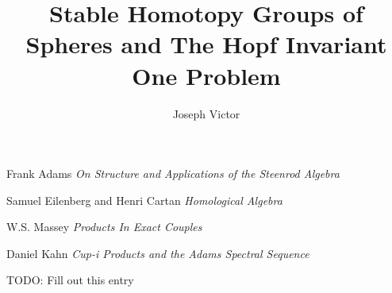 \documentclass[a4paper,12pt]{article}
\begin{document}
\newcommand{\A}[0]{\mathcal{A}}
\newcommand{\Z}[0]{\mathbb{Z}}

\newtheorem{mydef}{Definition}
\newtheorem{Theorem}{Theorem}
\newtheorem{Lemma}{Lemma}



\title{Stable Homotopy Groups of Spheres and The Hopf Invariant One Problem}
\author{Joseph Victor}
\maketitle







\begin{thebibliography}{99}

  Frank Adams
  \emph{On Structure and Applications of the Steenrod Algebra}
  
  Samuel Eilenberg and Henri Cartan
  \emph{Homological Algebra}

  W.S. Massey
  \emph{Products In Exact Couples}

  Daniel Kahn
  \emph{Cup-i Products and the Adams Spectral Sequence}

  TODO: Fill out this entry

\end{thebibliography}
\end{document}
